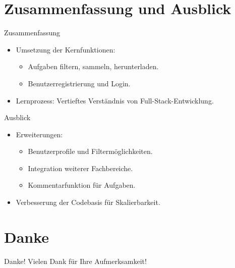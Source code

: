 \documentclass{beamer}
\begin{document}
\section{Zusammenfassung und Ausblick}
\begin{frame}{Zusammenfassung}
    \begin{itemize}
        \item Umsetzung der Kernfunktionen:
        \begin{itemize}
            \item Aufgaben filtern, sammeln, herunterladen.
            \item Benutzerregistrierung und Login.
        \end{itemize}
        \item Lernprozess: Vertieftes Verständnis von Full-Stack-Entwicklung.
    \end{itemize}
\end{frame}

\begin{frame}{Ausblick}
    \begin{itemize}
        \item Erweiterungen:
        \begin{itemize}
            \item Benutzerprofile und Filtermöglichkeiten.
            \item Integration weiterer Fachbereiche.
            \item Kommentarfunktion für Aufgaben.
        \end{itemize}
        \item Verbesserung der Codebasis für Skalierbarkeit.
    \end{itemize}
\end{frame}

\section*{Danke}
\begin{frame}{Danke!}
    \centering
    Vielen Dank für Ihre Aufmerksamkeit! \\
    \vspace{1cm}
   
\end{frame}
\end{document}
